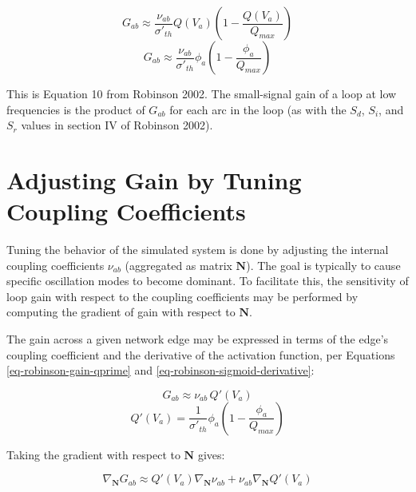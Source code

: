 \begin{equation}
G_{ab} \approx \frac{\nu_{ab}}{\sigma'_{th}}
Q(V_a) \left ( 1 - \frac{Q(V_a)}{Q_{max}} \right )
\end{equation}
%
\begin{equation}
G_{ab} \approx \frac{\nu_{ab}}{\sigma'_{th}}
\phi_a \left ( 1 - \frac{\phi_a}{Q_{max}} \right )
\label{eq-robinson-gain}
\end{equation}

This is Equation 10 from Robinson 2002. The small-signal gain of a loop at
low frequencies is the product of $G_{ab}$ for each arc in the loop
(as with the $S_d$, $S_i$, and $S_r$ values in section IV of Robinson 2002).



%
%
\section{Adjusting Gain by Tuning Coupling Coefficients}
\label{sect-robinson-math-tuning}
%
\newcommand{\deln}{\nabla_{\mathbf{N}}}

Tuning the behavior of the simulated system is done by adjusting the
internal coupling coefficients $\nu_{ab}$ (aggregated as matrix
$\mathbf{N}$). The goal is typically to cause specific oscillation modes
to become dominant. To facilitate this, the sensitivity of loop gain with
respect to the coupling coefficients may be performed by computing the
gradient of gain with respect to $\mathbf{N}$.

The gain across a given network edge may be expressed in terms of the
edge's coupling coefficient and the derivative of the activation function,
per Equations \ref{eq-robinson-gain-qprime} and
\ref{eq-robinson-sigmoid-derivative}:

\begin{equation}
G_{ab} \approx \nu_{ab} \, Q'(V_a)
\end{equation}
%
\begin{equation}
Q'(V_a) = \frac{1}{\sigma'_{th}} \phi_a
\left ( 1 - \frac{\phi_a}{Q_{max}} \right )
\end{equation}

Taking the gradient with respect to $\mathbf{N}$ gives:

\begin{equation}
\deln G_{ab} \approx Q'(V_a) \deln \nu_{ab} + \nu_{ab} \deln Q'(V_a)
\label{eq-robinson-gain-gradient}
\end{equation}

